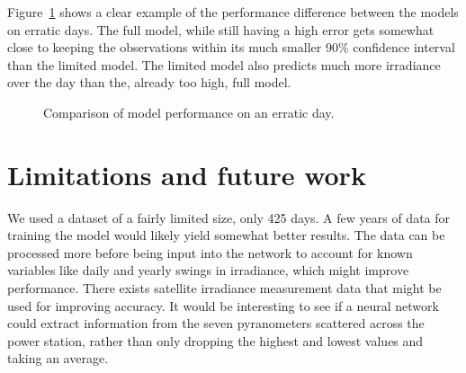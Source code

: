 Figure~\ref{fig:disc_high} shows a clear example of the performance difference between the models on erratic days. The full model, while still having a high error gets somewhat close to keeping the observations within its much smaller 90\% confidence interval than the limited model. The limited model also predicts much more irradiance over the day than the, already too high, full model.
\begin{figure}[ht!]
    \centering
    \qquad
    \qquad
    \caption{Comparison of model performance on an erratic day.
    \label{fig:disc_high}}
\end{figure}



\section{Limitations and future work}
We used a dataset of a fairly limited size, only 425 days. A few years of data for training the model would likely yield somewhat better results. The data can be processed more before being input into the network to account for known variables like daily and yearly swings in irradiance, which might improve performance. There exists satellite irradiance measurement data that might be used for improving accuracy. It would be interesting to see if a neural network could extract information from the seven pyranometers scattered across the power station, rather than only dropping the highest and lowest values and taking an average. 


